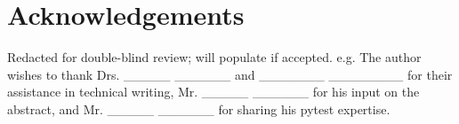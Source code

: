 \documentclass[10pt, conference]{IEEEtran}
\providecommand{\DIFaddbegin}{} %
\providecommand{\DIFaddend}{} %
\newcommand{\DIFaddincludegraphics}[2][]{{\color{blue}\fbox{\DIFOincludegraphics[#1]{#2}}}} %
\DeclareRobustCommand{\DIFaddbegin}{\DIFOaddbegin \let\includegraphics\DIFaddincludegraphics} %
\DeclareRobustCommand{\DIFaddend}{\DIFOaddend \let\includegraphics\DIFOincludegraphics} %
\begin{document}
 \section{Acknowledgements}\label{sec:acknowledgements}

Redacted for double-blind review; will populate if accepted.  e.g.
The author wishes to thank Drs. \_\_\_\_\_ \_\_\_\_\_\_ and \_\_\_\_\_\_\_ \_\_\_\_\_\_\_\_
for their assistance in technical writing, Mr. \_\_\_\_\_ \_\_\_\_\_\_
for his input on the abstract, and Mr. \_\_\_\_\_ \_\_\_\_\_\_ for sharing his pytest
expertise.
\DIFaddbegin 



 \newpage
\DIFaddend 



\end{document}

